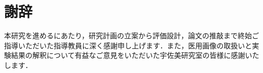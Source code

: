 \chapter*{謝辞}

\UsamiFictionalExampleNotice
\par\vspace{1.5\baselineskip}

本研究を進めるにあたり，研究計画の立案から評価設計，論文の推敲まで終始ご指導いただいた指導教員に深く感謝申し上げます．また，医用画像の取扱いと実験結果の解釈について有益なご意見をいただいた宇佐美研究室の皆様に感謝いたします．
